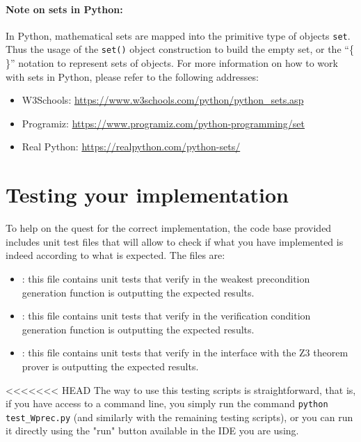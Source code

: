 \documentclass[11pt]{article}
\begin{document}
\paragraph{Note on sets in Python:} In Python, mathematical sets are mapped into the primitive type of objects \lstinline!set!. Thus the usage of the \lstinline!set()! object construction to build the empty set, or the ``\{ \}'' notation to represent sets of objects. For more information on how to work with sets in Python, please refer to the following addresses:
\begin{itemize}
  \item W3Schools: \url{https://www.w3schools.com/python/python_sets.asp}
  \item Programiz: \url{https://www.programiz.com/python-programming/set}
  \item Real Python: \url{https://realpython.com/python-sets/}
\end{itemize}

\section{Testing your implementation}

To help on the quest for the correct implementation, the code base provided includes unit test files that will allow to check if what you have implemented is indeed according to what is expected. The files are:
\begin{itemize}
  \item {}: this file contains unit tests that verify in the weakest precondition generation function is outputting the expected results.
  \item {}: this file contains unit tests that verify in the verification condition generation function is outputting the expected results.
  \item {}: this file contains unit tests that verify in the interface with the Z3 theorem prover is outputting the expected results.
\end{itemize}

<<<<<<< HEAD
The way to use this testing scripts is straightforward, that is, if you have access to a command line, you simply run the command \lstinline!python test_Wprec.py! (and similarly with the remaining testing scripts), or you can run it directly using the "run" button available in the IDE you are using.
\end{document}
